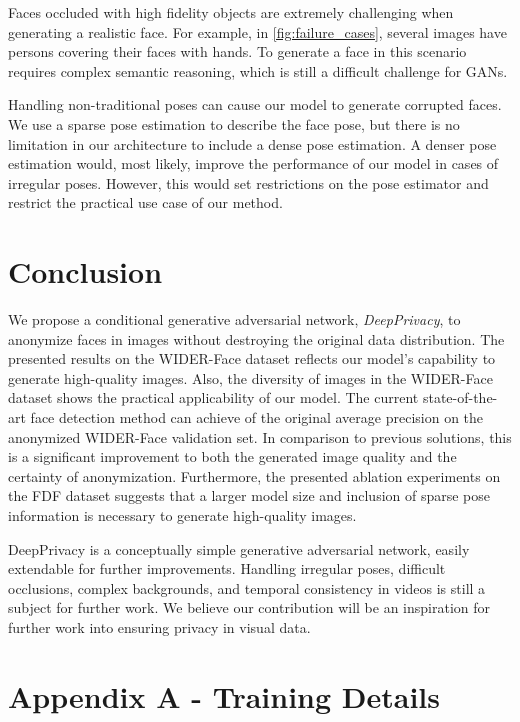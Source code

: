 \documentclass[runningheads]{llncs}
\begin{document}
Faces occluded with high fidelity objects are extremely challenging when generating a realistic face.
For example, in \autoref{fig:failure_cases}, several images have persons covering their faces with hands. To generate a face in this scenario requires complex semantic reasoning, which is still a difficult challenge for GANs. 

Handling non-traditional poses can cause our model to generate corrupted faces. We use a sparse pose estimation to describe the face pose, but there is no limitation in our architecture to include a dense pose estimation. A denser pose estimation would, most likely, improve the performance of our model in cases of irregular poses. However, this would set restrictions on the pose estimator and restrict the practical use case of our method.  \section{Conclusion}




We propose a conditional generative adversarial network, \textit{DeepPrivacy}, to anonymize faces in images without destroying the original data distribution. 
The presented results on the WIDER-Face dataset reflects our model's capability to generate high-quality images. Also, the diversity of images in the WIDER-Face dataset shows the practical applicability of our model. 
The current state-of-the-art face detection method can achieve  of the original average precision on the anonymized WIDER-Face validation set. In comparison to previous solutions, this is a significant improvement to both the generated image quality and the certainty of anonymization. Furthermore, the presented ablation experiments on the FDF dataset suggests that a larger model size and inclusion of sparse pose information is necessary to generate high-quality images. 

DeepPrivacy is a conceptually simple generative adversarial network, easily extendable for further improvements. Handling irregular poses, difficult occlusions, complex backgrounds, and temporal consistency in videos is still a subject for further work. 
We believe our contribution will be an inspiration for further work into ensuring privacy in visual data.




 \section*{Appendix A - Training Details}
\end{document}
